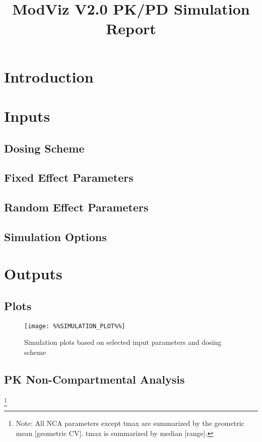 \documentclass[10pt]{article}
\newcommand\blfootnote[1]{%
  \begingroup
  \renewcommand\thefootnote{}\footnote{#1}%
  \addtocounter{footnote}{-1}%
  \endgroup
}
\begin{document}
\thispagestyle{empty}
\title{ModViz V2.0 PK/PD Simulation Report}
\maketitle
\tableofcontents

\section{Introduction}

\newpage
\begin{landscape}
\section{Inputs}
\subsection{Dosing Scheme}

\subsection{Fixed Effect Parameters}

\subsection{Random Effect Parameters}

\subsection{Simulation Options}


\newpage
\section{Outputs}
\subsection{Plots}
\begin{figure}[H]
\centering
\texttt{[image: \%\%SIMULATION\_PLOT\%\%]}
\caption{Simulation plots based on selected input parameters and dosing scheme}
\end{figure}

\newpage
\subsection{PK Non-Compartmental Analysis}
\blfootnote{Note: All NCA parameters except tmax are summarized by the geometric mean [geometric CV]. 
                                   tmax is summarized by median [range].}                                    
\end{landscape}
\end{document}
